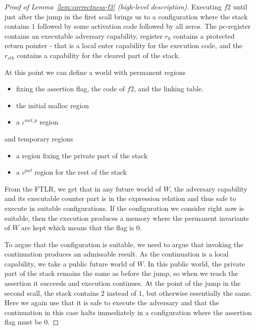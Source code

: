 \documentclass[a4paper]{article}
\newcommand{\var}[1]{\mathit{#1}}
\newcommand{\pcreg}{\mathrm{pc}}
\newcommand{\stk}{\var{stk}}
\newcommand{\nwl}{\var{nwl}}
\newcommand{\pwl}{\var{pwl}}
\newcommand{\plainperm}[1]{\mathrm{#1}}
\newcommand{\local}{\plainperm{local}}
\begin{document}
\begin{proof}[Proof of Lemma~\ref{lem:correctness-f3} (high-level description)]
Executing $f2$ until just after the jump in the first scall brings us to a configuration where the stack contains $1$ followed by some activation code followed by all zeros. The $\pcreg$-register contains an executable adversary capability, register $r_0$ contains a protected return pointer - that is a local enter capability for the execution code, and the $r_\stk$ contains a capability for the cleared part of the stack.

At this point we can define a world with permanent regions
\begin{itemize}
\item fixing the assertion flag, the code of $f2$, and the linking table.
\item the initial malloc region
\item a $\iota^{\nwl,p}$ region
\end{itemize}
and temporary regions
\begin{itemize}
\item a region fixing the private part of the stack
\item a $\iota^\pwl$ region for the rest of the stack 
\end{itemize}
From the FTLR, we get that in any future world of $W$, the adversary capability and its executable counter part is in the expression relation and thus safe to execute in suitable configurations. If the configuration we consider right now is suitable, then the execution produces a memory where the permanent invariants of $W$ are kept which means that the flag is $0$.

To argue that the configuration is suitable, we need to argue that invoking the continuation produces an admissable result. As the continuation is a $\local$ capability, we take a public future world of $W$. In this public world, the private part of the stack remains the same as before the jump, so when we reach the assertion it succeeds and execution continues. At the point of the jump in the second scall, the stack contains $2$ instead of $1$, but otherwise essentially the same. Here we again use that it is safe to execute the adversary and that the continuation in this case halts immediately in a configuration where the assertion flag must be $0$.
\end{proof}
\end{document}
